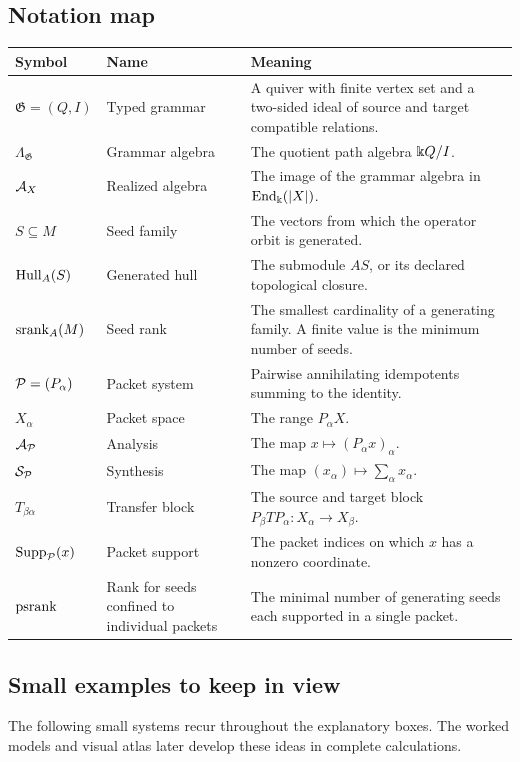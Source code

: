 \subsection*{Notation map}
\begingroup\small
\begin{center}
\begin{longtable}{@{}p{}p{}p{}@{}}
\toprule
\textbf{Symbol} & \textbf{Name} & \textbf{Meaning}\\
\midrule
\endhead
\(\mathfrak G=(Q,I)\) & Typed grammar & A quiver with finite vertex set and a two-sided ideal of source and target compatible relations.\\
\(\Lambda_{\mathfrak G}\) & Grammar algebra & The quotient path algebra \(\Bbbk Q/I\).\\
\(\mathcal A_X\) & Realized algebra & The image of the grammar algebra in \(\operatorname{End}_{\Bbbk}(|X|)\).\\
\(S\subseteq M\) & Seed family & The vectors from which the operator orbit is generated.\\
\(\operatorname{Hull}_A(S)\) & Generated hull & The submodule \(AS\), or its declared topological closure.\\
\(\operatorname{srank}_A(M)\) & Seed rank & The smallest cardinality of a generating family. A finite value is the minimum number of seeds.\\
\(\mathcal P=(P_\alpha)\) & Packet system & Pairwise annihilating idempotents summing to the identity.\\
\(X_\alpha\) & Packet space & The range \(P_\alpha X\).\\
\(\mathcal A_{\mathcal P}\) & Analysis & The map \(x\mapsto(P_\alpha x)_\alpha\).\\
\(\mathcal S_{\mathcal P}\) & Synthesis & The map \((x_\alpha)\mapsto\sum_\alpha x_\alpha\).\\
\(T_{\beta\alpha}\) & Transfer block & The source and target block \(P_\beta TP_\alpha:X_\alpha\to X_\beta\).\\
\(\operatorname{Supp}_{\mathcal P}(x)\) & Packet support & The packet indices on which \(x\) has a nonzero coordinate.\\
\(\operatorname{psrank}\) & Rank for seeds confined to individual packets & The minimal number of generating seeds each supported in a single packet.\\
\bottomrule
\end{longtable}
\end{center}
\endgroup

\subsection*{Small examples to keep in view}
The following small systems recur throughout the explanatory boxes. The worked models and visual atlas later develop these ideas in complete calculations.

